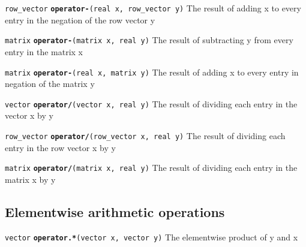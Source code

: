 \documentclass[
  10pt,
]{book}
\begin{document}
\texttt{row\_vector} \textbf{\texttt{operator-}}\texttt{(real\ x,\ row\_vector\ y)}\newline
The result of adding x to every entry in the negation of the row
vector y


\texttt{matrix} \textbf{\texttt{operator-}}\texttt{(matrix\ x,\ real\ y)}\newline
The result of subtracting y from every entry in the matrix x


\texttt{matrix} \textbf{\texttt{operator-}}\texttt{(real\ x,\ matrix\ y)}\newline
The result of adding x to every entry in negation of the matrix y


\texttt{vector} \textbf{\texttt{operator/}}\texttt{(vector\ x,\ real\ y)}\newline
The result of dividing each entry in the vector x by y


\texttt{row\_vector} \textbf{\texttt{operator/}}\texttt{(row\_vector\ x,\ real\ y)}\newline
The result of dividing each entry in the row vector x by y


\texttt{matrix} \textbf{\texttt{operator/}}\texttt{(matrix\ x,\ real\ y)}\newline
The result of dividing each entry in the matrix x by y

\hypertarget{elementwise-arithmetic-operations}{%
\subsection{Elementwise arithmetic operations}\label{elementwise-arithmetic-operations}}


\texttt{vector} \textbf{\texttt{operator.*}}\texttt{(vector\ x,\ vector\ y)}\newline
The elementwise product of y and x
\end{document}
